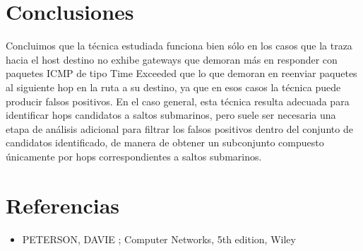 \documentclass[10pt, a4paper]{article}
\begin{document}
\section{Conclusiones}

Concluimos que la técnica estudiada funciona bien sólo en los casos que la traza hacia el host destino no exhibe gateways que demoran más en responder con paquetes ICMP de tipo Time Exceeded que lo que demoran en reenviar paquetes al siguiente hop en la ruta a su destino, ya que en esos casos la técnica puede producir falsos positivos.
En el caso general, esta técnica resulta adecuada para identificar hops candidatos a saltos submarinos, pero suele ser necesaria una etapa de análisis adicional para filtrar los falsos positivos dentro del conjunto de candidatos identificado, de manera de obtener un subconjunto compuesto únicamente por hops correspondientes a saltos submarinos.

\section{Referencias}
\begin{itemize}
\item PETERSON, DAVIE ; Computer Networks, 5th edition, Wiley


\end{itemize}
\end{document}
